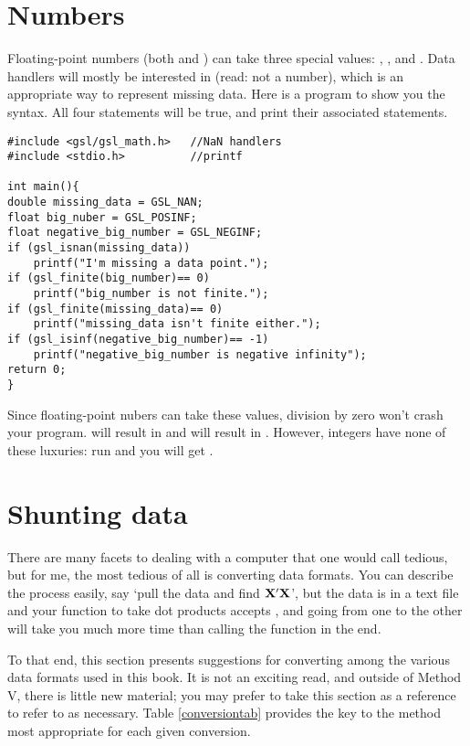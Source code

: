 \section{Numbers}      
Floating-point numbers (both  and ) can take three special values: , , and . Data handlers will mostly be
interested in  (read: not a number), which is an appropriate way to represent missing data. Here is a
program to show you the syntax. All four  statements will be true, and print their associated
statements.
\begin{lstlisting}
#include <gsl/gsl_math.h>   //NaN handlers
#include <stdio.h>          //printf

int main(){
double missing_data = GSL_NAN;
float big_nuber = GSL_POSINF;
float negative_big_number = GSL_NEGINF;
if (gsl_isnan(missing_data))
    printf("I'm missing a data point.");
if (gsl_finite(big_number)== 0)
    printf("big_number is not finite.");
if (gsl_finite(missing_data)== 0)
    printf("missing_data isn't finite either.");
if (gsl_isinf(negative_big_number)== -1)
    printf("negative_big_number is negative infinity");
return 0;
}
\end{lstlisting}

Since floating-point nubers can take these values, division by zero
won't crash your program.  will result in
 and  will result in . However, integers have none of these luxuries: run  and you will get .


\section{Shunting data} \label{asst_conversions} 
There are many facets to dealing with a computer that one would call
tedious, but for me, the most tedious of all is converting data formats.
You can describe the process easily, say `pull the data and find
${\bf X}'{\bf X}$', but the data is in a text file and your function to take dot
products accepts , and going from one
to the other will take you much more time than calling the function in
the end.

To that end, this section presents
suggestions for converting among the various data formats used in this
book. It is not an exciting
read, and outside of Method V, there is little new material; you may
prefer to take this section as a reference to refer to as necessary. Table
\ref{conversiontab} provides the key to the method most appropriate for
each given conversion. 

